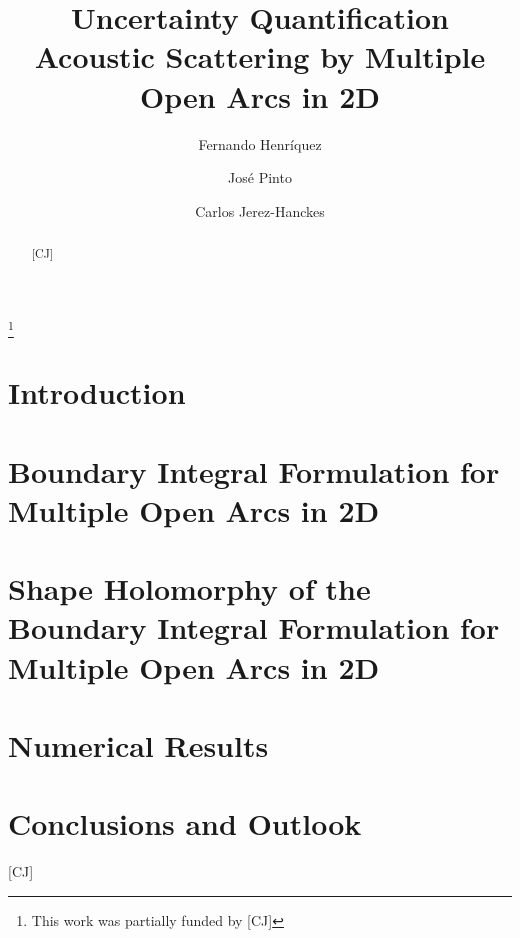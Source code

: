 \documentclass[10pt,reqno]{amsart}
\theoremstyle{remark}
\newcommand{\com}[1]{{{\color{red} [#1]}}}
\numberwithin{equation}{section}
\begin{document}
\title[]{Uncertainty Quantification Acoustic Scattering by Multiple Open Arcs in 2D}
\author[Fernando Henr\'iquez]{Fernando Henr\'iquez} \address{Seminar for Applied Mathematics, ETH Z$\ddot{\mbox{u}}$rich, CH-8092
  Z$\ddot{\mbox{u}}$rich, Switzerland} 
\author[Jos\'e Pinto]{Jos\'e Pinto} \address{School of Engineering, Pontificia
  Universidad Cat\'olica de Chile, Santiago, Chile} 
\author[Carlos Jerez-Hanckes]{Carlos Jerez-Hanckes} \address{School of Engineering, Pontificia
  Universidad Cat\'olica de Chile, Santiago, Chile} 
  
\thanks{This work was partially funded by \com{CJ}}

\maketitle

\begin{abstract}
\com{CJ}


\end{abstract}

\newpage

\tableofcontents

\newpage

\section{Introduction}
\label{sec:intro}

\section{Boundary Integral Formulation for Multiple Open Arcs in 2D}
\label{sec:BIF_2D}

\section{Shape Holomorphy of the Boundary Integral Formulation for Multiple Open Arcs in 2D}
\label{ssec:shape_hol}


\section{Numerical Results}
\label{sec:intro}


\section{Conclusions and Outlook}
\label{sec:intro}

\com{CJ}
\end{document}
